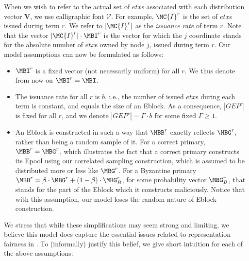 When we wish to refer to the actual set of $etx$s associated with each distribution vector $\mathbf{V}$, we use calligraphic font $\mathcal{V}$. For example, $\MC{I}^r$ is the set of $etx$s issued during term $r$. We refer to $\vert \MC{I}^r\vert$ as the \textit{issuance rate} of term $r$. Note that the vector $\vert \MC{I}^r\vert\cdot \MBI^r$ is the vector for which the $j$ coordinate stands for the absolute number of $etx$s owned by node $j$, issued during term $r$. Our model assumptions can now be formulated as follows: 
\begin{itemize}
	\item $\MBI^r$ is a fixed vector (not necessarily uniform) for all $r$. We thus denote from now on $\MBI^r=\MBI$.
    \item The issuance rate for all $r$ is $b$, i.e., the number of issued $etx$s during each term is constant, and equals the size of an Eblock. As a consequence, $|GEP^r|$ is fixed for all $r$, and we denote $|GEP^r|=\Gamma\cdot b$ for some fixed $\Gamma\ge 1$.
    \item An Eblock is constructed in such a way that $\MBB^r$ exactly reflects $\MBG^r$, rather than being a random sample of it. For a correct primary, $\MBB^r=\MBG^r$, which illustrates the fact that a correct primary constructs its Epool using our correlated sampling construction, which is assumed to be distributed more or less like $\MBG^r$. For a Byzantine primary $\MBB^r=\beta\cdot \MBG^r +(1-\beta)\cdot \MBG^r_B$, for some probability vector $\MBG^r_B$, that stands for the part of the Eblock which it constructs maliciously. Notice that with this assumption, our model loses the random nature of Eblock construction.
\end{itemize}
We stress that while these simplifications may seem strong and limiting, we believe this model does capture the essential issues related to representation fairness in \nameNS. To (informally) justify this belief, we give short intuition for each of the above assumptions:

